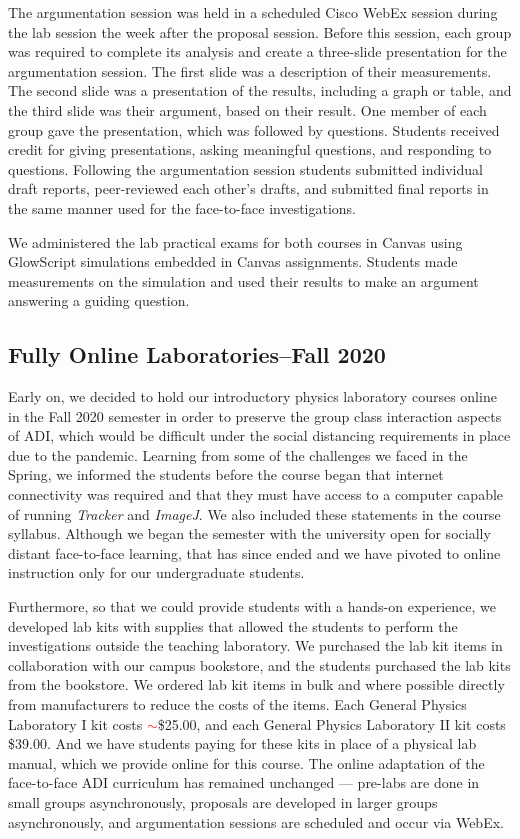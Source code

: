 \documentclass[aip, numerical, preprint]{revtex4-2}
\begin{document}
The argumentation session was held in a scheduled Cisco WebEx session during the lab session
the week after the proposal session. Before this session, each group was required to complete
its analysis and create a three-slide presentation for the argumentation session. The first
slide was a description of their measurements. The second slide was a presentation of the
results, including a graph or table, and the third slide was their argument, based on their
result.  One member of each group gave the presentation, which was followed by
questions. Students received credit for giving presentations, asking meaningful questions, and
responding to questions.  Following the argumentation session students submitted individual
draft reports, peer-reviewed each other's drafts, and submitted final reports in the same
manner used for the face-to-face investigations.

We administered the lab practical exams for both courses in Canvas using GlowScript simulations
embedded in Canvas assignments. Students made measurements on the simulation and used their
results to make an argument answering a guiding question.

\subsection{Fully Online Laboratories--Fall 2020}

Early on, we decided to hold our introductory physics laboratory courses online in the Fall
2020 semester in order to preserve the group class interaction aspects of ADI, which would be
difficult under the social distancing requirements in place due to the
pandemic.\citep{mclber20} Learning from some of the challenges we faced in the Spring, we
informed the students before the course began that internet connectivity was required and that
they must have access to a computer capable of running \emph{Tracker}\citep{bro2009} and \emph{ImageJ}.\citep{schrasetal12} We also included these statements in the course
syllabus. Although we began the semester with the university open for socially distant
face-to-face learning, that has since ended and we have pivoted to online instruction only for
our undergraduate students.

Furthermore, so that we could provide students with a hands-on experience, we developed lab
kits with supplies that allowed the students to perform the investigations outside the teaching
laboratory. We purchased the lab kit items in collaboration with our campus bookstore, and the
students purchased the lab kits from the bookstore. We ordered lab kit items in bulk and where
possible directly from manufacturers to reduce the costs of the items. Each General Physics
Laboratory I kit costs \textcolor{red}{$\sim$}\$25.00, and each General Physics Laboratory II
kit costs \$39.00. And we have students paying for these kits in place of a physical lab
manual, which we provide online for this course.  The online adaptation of the face-to-face ADI
curriculum has remained unchanged --- pre-labs are done in small groups asynchronously,
proposals are developed in larger groups asynchronously, and argumentation sessions are
scheduled and occur via WebEx.
\end{document}

